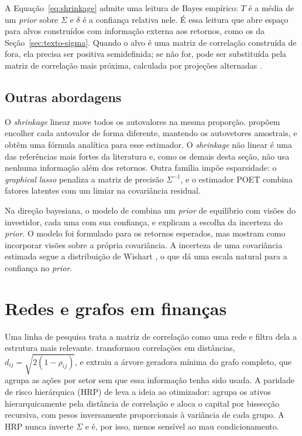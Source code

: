 A Equação~\eqref{eq:shrinkage} admite uma leitura de Bayes empírico: $T$ é a média de um \emph{prior}
sobre $\Sigma$ e $\delta$ é a confiança relativa nele. É essa leitura que abre espaço para alvos
construídos com informação externa aos retornos, como os da Seção~\ref{sec:texto-sigma}. Quando o alvo é
uma matriz de correlação construída de fora, ela precisa ser positiva semidefinida; se não for, pode ser
substituída pela matriz de correlação mais próxima, calculada por projeções alternadas
\citep{higham2002}.

\subsection{Outras abordagens}

O \emph{shrinkage} linear move todos os autovalores na mesma proporção. \citet{ledoit2017} propõem
encolher cada autovalor de forma diferente, mantendo os autovetores amostrais, e \citet{ledoit2020} obtêm
uma fórmula analítica para esse estimador. O \emph{shrinkage} não linear é uma das referências mais fortes
da literatura e, como os demais desta seção, não usa nenhuma informação além dos retornos. Outra família
impõe esparsidade: o \emph{graphical lasso} \citep{friedman2008} penaliza a matriz de precisão
$\Sigma^{-1}$, e o estimador POET \citep{fan2013} combina fatores latentes com um limiar na covariância
residual.

Na direção bayesiana, o modelo de \citet{black1992} combina um \emph{prior} de equilíbrio com visões do
investidor, cada uma com sua confiança, e \citet{he1999} explicam a escolha da incerteza do \emph{prior}.
O modelo foi formulado para os retornos esperados, mas \citet{qian2001} mostram como incorporar visões
sobre a própria covariância. A incerteza de uma covariância estimada segue a distribuição de Wishart
\citep{anderson2003}, o que dá uma escala natural para a confiança no \emph{prior}.

\section{Redes e grafos em finanças}
\label{sec:redes}

Uma linha de pesquisa trata a matriz de correlação como uma rede e filtra dela a estrutura mais
relevante. \citet{mantegna1999} transformou correlações em distâncias,
$d_{ij}=\sqrt{2(1-\rho_{ij})}$, e extraiu a árvore geradora mínima do grafo completo, que agrupa as ações
por setor sem que essa informação tenha sido usada. A paridade de risco hierárquica (HRP) de
\citet{lopezdeprado2016} leva a ideia ao otimizador: agrupa os ativos hierarquicamente pela distância de
correlação e aloca o capital por bissecção recursiva, com pesos inversamente proporcionais à variância de
cada grupo. A HRP nunca inverte $\Sigma$ e é, por isso, menos sensível ao mau condicionamento.

